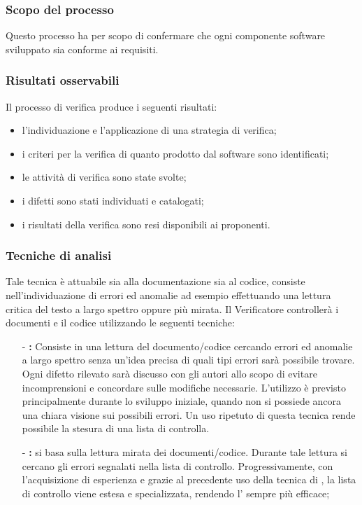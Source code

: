 \documentclass[a4paper,11pt]{article}
\begin{document}
				\subsubsection{Scopo del processo}
					Questo processo ha per scopo di confermare che ogni componente software sviluppato sia conforme ai requisiti.		
				\subsubsection{Risultati osservabili}
				Il processo di verifica produce i seguenti risultati:
				\begin{itemize}
					\item l'individuazione e l'applicazione di una strategia di verifica;
					\item i criteri per la verifica di quanto prodotto dal software sono identificati;
					\item le attività di verifica sono state svolte;
					\item i difetti sono stati individuati e catalogati;
					\item i risultati della verifica sono resi disponibili ai proponenti.
				\end{itemize}
				
				\subsubsection{Tecniche di analisi}
				Tale tecnica è attuabile sia alla documentazione sia al codice, consiste nell'individuazione di errori ed anomalie ad esempio effettuando una lettura critica del testo a largo spettro oppure più mirata. Il Verificatore controllerà i documenti e il codice utilizzando le seguenti tecniche:
				\begin{itemize}
				\item[-]\textbf{:} Consiste in una lettura del documento/codice cercando errori ed anomalie a largo spettro senza un'idea precisa di quali tipi errori sarà possibile trovare. Ogni difetto rilevato sarà discusso con gli autori allo scopo di evitare incomprensioni e concordare sulle modifiche necessarie. L'utilizzo è previsto principalmente durante lo sviluppo iniziale, quando non si possiede ancora una chiara visione sui possibili errori. Un uso ripetuto di questa tecnica rende possibile la stesura di una lista di controlla. 		
				
				\item[-]\textbf{:} si basa sulla lettura mirata dei documenti/codice. Durante tale lettura si cercano gli errori segnalati nella lista di controllo. Progressivamente, con l'acquisizione di esperienza e grazie al precedente uso della tecnica di , la lista di controllo viene estesa e specializzata, rendendo l'  sempre più efficace;
				\end{itemize}
				
\end{document}
